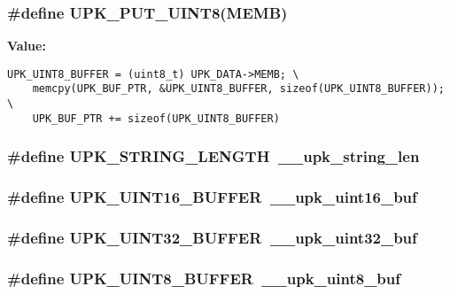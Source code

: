 \subsubsection{\setlength{\rightskip}{0pt plus 5cm}\#define UPK\_\-PUT\_\-UINT8(MEMB)}\label{protocol_8h_f45d4f56f91ebb47a25ba8025e4f629e}


\textbf{Value:}

\begin{Code}\begin{verbatim}UPK_UINT8_BUFFER = (uint8_t) UPK_DATA->MEMB; \
    memcpy(UPK_BUF_PTR, &UPK_UINT8_BUFFER, sizeof(UPK_UINT8_BUFFER)); \
    UPK_BUF_PTR += sizeof(UPK_UINT8_BUFFER)
\end{verbatim}\end{Code}
\subsubsection{\setlength{\rightskip}{0pt plus 5cm}\#define UPK\_\-STRING\_\-LENGTH~\_\-\_\-upk\_\-string\_\-len}\label{protocol_8h_0c771c3d1836d60abfbc095e9c9581dd}


\subsubsection{\setlength{\rightskip}{0pt plus 5cm}\#define UPK\_\-UINT16\_\-BUFFER~\_\-\_\-upk\_\-uint16\_\-buf}\label{protocol_8h_5f092c5ce4662e01bc812ff22d2a3972}


\subsubsection{\setlength{\rightskip}{0pt plus 5cm}\#define UPK\_\-UINT32\_\-BUFFER~\_\-\_\-upk\_\-uint32\_\-buf}\label{protocol_8h_5407eb4b71a5459f22c841d88db4ce70}


\subsubsection{\setlength{\rightskip}{0pt plus 5cm}\#define UPK\_\-UINT8\_\-BUFFER~\_\-\_\-upk\_\-uint8\_\-buf}\label{protocol_8h_8c4be32ae976a2695ace5613077cd0d2}


